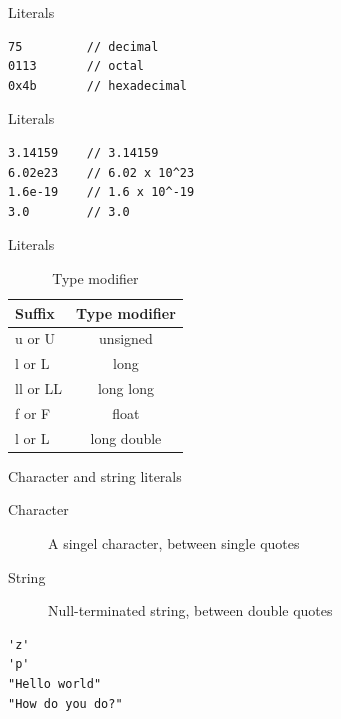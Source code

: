 \documentclass{beamer}
\begin{document}
\begin{frame}[fragile]{Literals}

\begin{lstlisting}[caption=Integer Numerals]
75         // decimal
0113       // octal
0x4b       // hexadecimal
\end{lstlisting}

\end{frame}

\begin{frame}[fragile]{Literals}

\begin{lstlisting}[caption=Floating Point Numerals]
3.14159    // 3.14159
6.02e23    // 6.02 x 10^23
1.6e-19    // 1.6 x 10^-19
3.0        // 3.0
\end{lstlisting}

\end{frame}

\begin{frame}{Literals}
\begin{table}
\begin{tabular}{l | c}
Suffix & Type modifier \\
\hline
u or U & unsigned \\
l or L & long \\
ll or LL & long long \\
f or F & float \\
l or L & long double
\end{tabular}
\caption{Type modifier}
\end{table}

\end{frame}

\begin{frame}[fragile]{Character and string literals}
\begin{description}
\item[Character] A singel character, between single quotes
\item[String] Null-terminated string, between double quotes 
\end{description}
\begin{lstlisting}[caption=Character and string literals]
'z'
'p'
"Hello world"
"How do you do?"
\end{lstlisting}

\end{frame}
\end{document}
